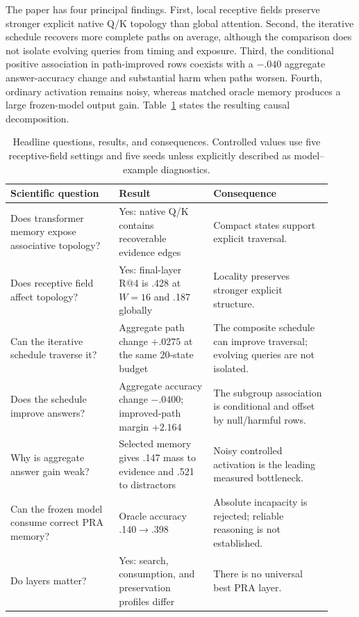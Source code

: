 The paper has four principal findings.  First, local receptive fields preserve stronger explicit
native Q/K topology than global attention.  Second, the iterative schedule recovers more complete
paths on average, although the comparison does not isolate evolving queries from timing and exposure.
Third, the conditional positive association in path-improved rows coexists with a $-.040$ aggregate
answer-accuracy change and substantial harm when paths worsen.  Fourth, ordinary activation remains
noisy, whereas matched oracle memory produces a large frozen-model output gain.
Table~\ref{tab:headline-questions} states the resulting causal decomposition.

\begin{table}[H]
\centering
\caption{Headline questions, results, and consequences.  Controlled values use five receptive-field
settings and five seeds unless explicitly described as model--example diagnostics.}
\label{tab:headline-questions}
\scriptsize
\begin{tabular}{p{0.31\linewidth}p{0.27\linewidth}p{0.34\linewidth}}
\toprule
Scientific question & Result & Consequence \\
\midrule
Does transformer memory expose associative topology? & Yes: native Q/K contains recoverable evidence edges & Compact states support explicit traversal. \\
Does receptive field affect topology? & Yes: final-layer R@4 is .428 at $W=16$ and .187 globally & Locality preserves stronger explicit structure. \\
Can the iterative schedule traverse it? & Aggregate path change $+.0275$ at the same 20-state budget & The composite schedule can improve traversal; evolving queries are not isolated. \\
Does the schedule improve answers? & Aggregate accuracy change $-.0400$; improved-path margin $+2.164$ & The subgroup association is conditional and offset by null/harmful rows. \\
Why is aggregate answer gain weak? & Selected memory gives .147 mass to evidence and .521 to distractors & Noisy controlled activation is the leading measured bottleneck. \\
Can the frozen model consume correct PRA memory? & Oracle accuracy .140$\rightarrow$.398 & Absolute incapacity is rejected; reliable reasoning is not established. \\
Do layers matter? & Yes: search, consumption, and preservation profiles differ & There is no universal best PRA layer. \\
\bottomrule
\end{tabular}
\end{table}

